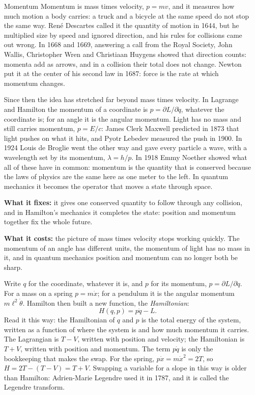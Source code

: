 \begin{concept}{Momentum}
Momentum is mass times velocity, $p = mv$, and it measures how much motion a body
carries: a truck and a bicycle at the same speed do not stop the same way. René
Descartes called it the quantity of motion in 1644, but he multiplied size by speed
and ignored direction, and his rules for collisions came out wrong. In 1668 and 1669,
answering a call from the Royal Society, John Wallis, Christopher Wren and Christiaan
Huygens showed that direction counts: momenta add as arrows, and in a collision their
total does not change. Newton put it at the center of his second law in 1687: force is
the rate at which momentum changes.

Since then the idea has stretched far beyond mass times velocity. In Lagrange and
Hamilton the momentum of a coordinate is $p = \partial L/\partial\dot q$, whatever the
coordinate is; for an angle it is the angular momentum. Light has no mass and still
carries momentum, $p = E/c$: James Clerk Maxwell predicted in 1873 that light pushes on
what it hits, and Pyotr Lebedev measured the push in 1900. In 1924 Louis de Broglie
went the other way and gave every particle a wave, with a wavelength set by its
momentum, $\lambda = h/p$. In 1918 Emmy Noether showed what all of these have in
common: momentum is the quantity that is conserved because the laws of physics are
the same here as one meter to the left. In quantum mechanics it becomes the operator
that moves a state through space.

\textbf{What it fixes:} it gives one conserved quantity to follow through any
collision, and in Hamilton's mechanics it completes the state: position and momentum
together fix the whole future.

\textbf{What it costs:} the picture of mass times velocity stops working quickly. The
momentum of an angle has different units, the momentum of light has no mass in it,
and in quantum mechanics position and momentum can no longer both be sharp.
\end{concept}

Write $q$ for the coordinate, whatever it is, and $p$ for its momentum,
$p = \partial L/\partial\dot q$. For a mass on a spring $p = m\dot x$; for a pendulum
it is the angular momentum $m\ell^2\dot\theta$. Hamilton then built a new function,
the \emph{Hamiltonian}:
\[
  H(q, p) = p\dot{q} - L .
\]
Read it this way: the Hamiltonian of $q$ and $p$ is the total energy of the system,
written as a function of where the system is and how much momentum it carries. The
Lagrangian is $T - V$, written with position and velocity; the Hamiltonian is
$T + V$, written with position and momentum. The term $p\dot q$ is only the
bookkeeping that makes the swap. For the spring, $p\dot x = m\dot x^2 = 2T$, so
$H = 2T - (T - V) = T + V$. Swapping a variable for a slope in this way is older than
Hamilton: Adrien-Marie Legendre used it in 1787, and it is called the Legendre
transform.

